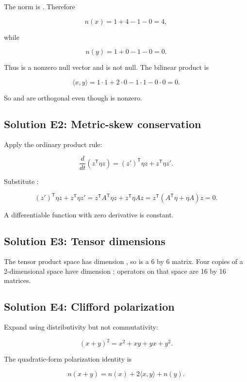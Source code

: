 \documentclass[11pt]{article}
\begin{document}
The norm is \texttt{}. Therefore

\[
n(x)=1+4-1-0=4,
\]

while

\[
n(y)=1+0-1-0=0.
\]

Thus \texttt{} is a nonzero null vector and \texttt{} is not null. The bilinear product is

\[
\langle x,y\rangle=1\cdot1+2\cdot0-1\cdot1-0\cdot0=0.
\]

So \texttt{} and \texttt{} are orthogonal even though \texttt{} is nonzero.

\subsection{Solution E2: Metric-skew conservation}

Apply the ordinary product rule:

\[
\frac{d}{dt}(z^{\mathsf T}\eta z)
=(z')^{\mathsf T}\eta z+z^{\mathsf T}\eta z'.
\]

Substitute \texttt{}:

\[
(z')^{\mathsf T}\eta z+z^{\mathsf T}\eta z'
=z^{\mathsf T}A^{\mathsf T}\eta z+z^{\mathsf T}\eta Az
=z^{\mathsf T}(A^{\mathsf T}\eta+\eta A)z=0.
\]

A differentiable function with zero derivative is constant.

\subsection{Solution E3: Tensor dimensions}

The tensor product space has dimension \texttt{}, so \texttt{} is a 6 by 6 matrix. Four copies of a 2-dimensional space have dimension \texttt{}; operators on that space are 16 by 16 matrices.

\subsection{Solution E4: Clifford polarization}

Expand using distributivity but not commutativity:

\[
(x+y)^2=x^2+xy+yx+y^2.
\]

The quadratic-form polarization identity is

\[
n(x+y)=n(x)+2\langle x,y\rangle+n(y).
\]
\end{document}

